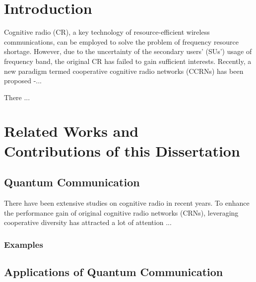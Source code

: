 \documentclass[master,english,final]{kaist-ucs}
\begin{document}
    \tableofcontents

    \listoftables

    \listoffigures



\chapter{Introduction}
\noindent
Cognitive radio (CR), a key technology of resource-efficient wireless communications, can be employed to solve the problem of frequency resource shortage. However, due to the uncertainty of the secondary users' (SUs') usage of frequency band, the original CR has failed to gain sufficient interests. Recently, a new paradigm termed cooperative cognitive radio networks (CCRNs) has been proposed \cite{FD1}-\cite{ML1}...

There ...

\chapter[Related Works and Contributions of this Dissertation]{Related Works and \\ Contributions of this Dissertation}

\section{Quantum Communication}

There have been extensive studies on cognitive radio in recent years. To enhance the performance gain of original cognitive radio networks (CRNs), leveraging cooperative diversity has attracted a lot of attention \cite{SOCA1}...

\subsection{Examples}


\section{Applications of Quantum Communication}
\end{document}
